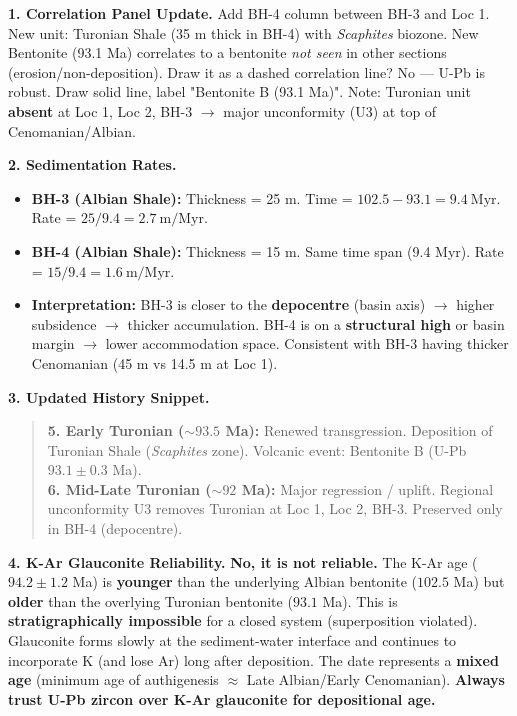 \documentclass[11pt]{article}
\newcommand{\cle}[1]{{\popxbold\color{popdark}#1}}
\begin{document}
\begin{corrige}
\textbf{1. Correlation Panel Update.} Add BH-4 column between BH-3 and Loc 1. New unit: \cle{Turonian Shale} (35 m thick in BH-4) with \emph{Scaphites} biozone. New Bentonite (93.1 Ma) correlates to a bentonite \emph{not seen} in other sections (erosion/non-deposition). Draw it as a dashed correlation line? No — U-Pb is robust. Draw solid line, label "Bentonite B (93.1 Ma)". Note: Turonian unit \textbf{absent} at Loc 1, Loc 2, BH-3 $\rightarrow$ major unconformity (U3) at top of Cenomanian/Albian.

\textbf{2. Sedimentation Rates.}
\begin{itemize}
    \item \textbf{BH-3 (Albian Shale):} Thickness = 25 m. Time = $102.5 - 93.1 = 9.4\ \mathrm{Myr}$. Rate = $25 / 9.4 = \mathbf{2.7\ \mathrm{m/Myr}}$.
    \item \textbf{BH-4 (Albian Shale):} Thickness = 15 m. Same time span (9.4 Myr). Rate = $15 / 9.4 = \mathbf{1.6\ \mathrm{m/Myr}}$.
    \item \textbf{Interpretation:} BH-3 is closer to the \textbf{depocentre} (basin axis) $\rightarrow$ higher subsidence $\rightarrow$ thicker accumulation. BH-4 is on a \textbf{structural high} or basin margin $\rightarrow$ lower accommodation space. Consistent with BH-3 having thicker Cenomanian (45 m vs 14.5 m at Loc 1).
\end{itemize}

\textbf{3. Updated History Snippet.}
\begin{quote}
\textbf{5. Early Turonian ($\sim 93.5$ Ma):} Renewed transgression. Deposition of Turonian Shale (\emph{Scaphites} zone). Volcanic event: Bentonite B (U-Pb $93.1 \pm 0.3$ Ma). \\
\textbf{6. Mid-Late Turonian ($\sim 92$ Ma):} Major regression / uplift. Regional unconformity U3 removes Turonian at Loc 1, Loc 2, BH-3. Preserved only in BH-4 (depocentre).
\end{quote}

\textbf{4. K-Ar Glauconite Reliability.}
\textbf{No, it is not reliable.} The K-Ar age ($94.2 \pm 1.2$ Ma) is \textbf{younger} than the underlying Albian bentonite ($102.5$ Ma) but \textbf{older} than the overlying Turonian bentonite ($93.1$ Ma). This is \textbf{stratigraphically impossible} for a closed system (superposition violated). Glauconite forms slowly at the sediment-water interface and continues to incorporate K (and lose Ar) long after deposition. The date represents a \textbf{mixed age} (minimum age of authigenesis $\approx$ Late Albian/Early Cenomanian). \textbf{Always trust U-Pb zircon over K-Ar glauconite for depositional age.}
\end{corrige}
\end{document}
